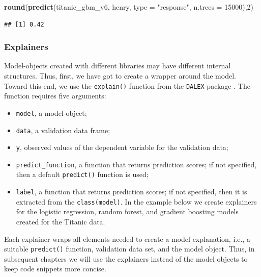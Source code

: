 \documentclass[12pt,]{krantz}
\newenvironment{Shaded}{\begin{snugshade}}{\end{snugshade}}
\newcommand{\DataTypeTok}[1]{\textcolor[rgb]{0.13,0.29,0.53}{#1}}
\newcommand{\DecValTok}[1]{\textcolor[rgb]{0.00,0.00,0.81}{#1}}
\newcommand{\KeywordTok}[1]{\textcolor[rgb]{0.13,0.29,0.53}{\textbf{#1}}}
\newcommand{\NormalTok}[1]{#1}
\newcommand{\StringTok}[1]{\textcolor[rgb]{0.31,0.60,0.02}{#1}}
\providecommand{\tightlist}{%
  \setlength{\itemsep}{0pt}\setlength{\parskip}{0pt}}
\theoremstyle{definition}
\theoremstyle{definition}
\theoremstyle{definition}
\theoremstyle{remark}
\begin{document}
\begin{Shaded}
\begin{Highlighting}[]
\KeywordTok{round}\NormalTok{(}\KeywordTok{predict}\NormalTok{(titanic_gbm_v6, henry, }\DataTypeTok{type =} \StringTok{"response"}\NormalTok{, }\DataTypeTok{n.trees =} \DecValTok{15000}\NormalTok{),}\DecValTok{2}\NormalTok{)}
\end{Highlighting}
\end{Shaded}

\begin{verbatim}
## [1] 0.42
\end{verbatim}

\hypertarget{ExplainersTitanicRCode}{%
\subsubsection{Explainers}\label{ExplainersTitanicRCode}}

Model-objects created with different libraries may have different
internal structures. Thus, first, we have got to create a wrapper around
the model. Toward this end, we use the \texttt{explain()} function from
the \texttt{DALEX} package \citep{R-DALEX}. The function requires five
arguments:

\begin{itemize}
\tightlist
\item
  \texttt{model}, a model-object;
\item
  \texttt{data}, a validation data frame;
\item
  \texttt{y}, observed values of the dependent variable for the
  validation data;
\item
  \texttt{predict\_function}, a function that returns prediction scores;
  if not specified, then a default \texttt{predict()} function is used;
\item
  \texttt{label}, a function that returns prediction scores; if not
  specified, then it is extracted from the \texttt{class(model)}. In the
  example below we create explainers for the logistic regression, random
  forest, and gradient boosting models created for the Titanic data.
\end{itemize}

Each explainer wraps all elements needed to create a model explanation,
i.e., a suitable \texttt{predict()} function, validation data set, and
the model object. Thus, in subsequent chapters we will use the
explainers instead of the model objects to keep code snippets more
concise.
\end{document}

